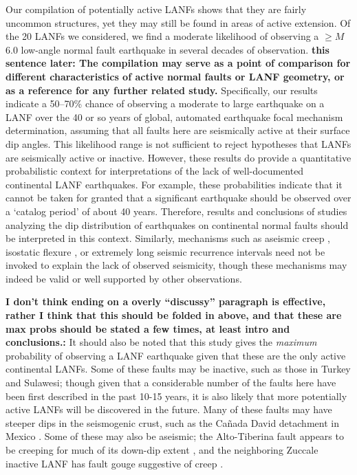 \documentclass[twocolumn,grl]{AGUTeX}
\begin{document}
\begin{article}
Our compilation of potentially active LANFs shows that they are fairly
uncommon structures, yet they may still be found in areas of active
extension. Of the 20 LANFs we considered, we find a moderate
likelihood of observing a $\ge M$6.0 low-angle normal fault earthquake
in several decades of observation.  {\bf this sentence later: The
  compilation may serve as a point of comparison for different
  characteristics of active normal faults or LANF geometry, or as a
  reference for any further related study.} Specifically, our results
indicate a 50--70\% chance of observing a moderate to large earthquake
on a LANF over the 40 or so years of global, automated earthquake
focal mechanism determination, assuming that all faults here are
seismically active at their surface dip angles.  This likelihood range
is not sufficient to reject hypotheses that LANFs are seismically
active or inactive. However, these results do provide a quantitative
probabilistic context for interpretations of the lack of
well-documented continental LANF earthquakes.  For example, these
probabilities indicate that it cannot be taken for granted that a
significant earthquake should be observed over a `catalog period' of
about 40 years. Therefore, results and conclusions of studies
analyzing the dip distribution of earthquakes on continental normal
faults \citep{jackson1987, collettinisibson2001} should be interpreted
in this context.  Similarly, mechanisms such as aseismic creep \citep
[e.g.,][]{collettini2011lanfmech, hreinsdottir2009altotib}, isostatic
flexure \citep[e.g.,][] {wernickeaxen1988rolling}, or extremely long
seismic recurrence intervals \citep{wernicke1995seis} need not be
invoked to explain the lack of observed seismicity, though these
mechanisms may indeed be valid or well supported by other
observations.

{\bf I don't think ending on a overly ``discussy'' paragraph is
  effective, rather I think that this should be folded in above, and
  that these are max probs should be stated a few times, at least
  intro and conclusions.:} It should also be noted that this study
gives the \emph{maximum} probability of observing a LANF earthquake
given that these are the only active continental LANFs.  Some of these
faults may be inactive, such as those in Turkey and Sulawesi; though
given that a considerable number of the faults here have been first
described in the past 10-15 years, it is also likely that more
potentially active LANFs will be discovered in the future.  Many of
these faults may have steeper dips in the seismogenic crust, such as
the Ca\~nada David detachment in Mexico \citep{fletcherspelz2009}.
Some of these may also be aseismic; the Alto-Tiberina fault appears to
be creeping for much of its down-dip extent
\citep{hreinsdottir2009altotib}, and the neighboring Zuccale inactive
LANF has fault gouge suggestive of creep
\citep{collettiniholdsworth2004}.


\end{article}
\end{document}
